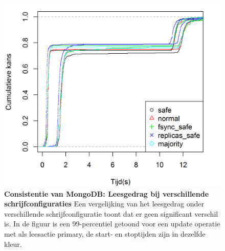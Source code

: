 \begin{figure}[ht!] 
	\centering \includegraphics[width=.70\textwidth]{img/Observaties/MongoDB/ECDF-Write-update-primarypreferred-1-2}
	\caption{\textbf{Consistentie van MongoDB: Leesgedrag bij verschillende schrijfconfiguraties } \newline
	Een vergelijking van het leesgedrag onder verschillende schrijfconfiguratie toont dat er geen significant verschil is. In de figuur is een 99-percentiel getoond voor een update operatie met als leesactie primary, de start- en stoptijden zijn in dezelfde kleur.  
	 } 
	\label{fig:consistentie-mongodb-verschillende-schrijfacties}
\end{figure}

